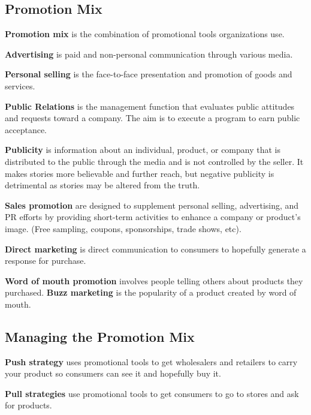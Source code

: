 \documentclass[english, 12pt]{article}
\begin{document}
\subsection{Promotion Mix}
\begin{defn}
\textbf{Promotion mix} is the combination of promotional tools organizations use.
\end{defn}
\begin{defn}
\textbf{Advertising} is paid and non-personal communication through various media.
\end{defn}
\begin{defn}
\textbf{Personal selling} is the face-to-face presentation and promotion of goods and services.
\end{defn}
\begin{defn}
\textbf{Public Relations} is the management function that evaluates public attitudes and requests toward a company. The aim is to execute a program to earn public acceptance.
\end{defn}
\begin{defn}
\textbf{Publicity} is information about an individual, product, or company that is distributed to the public through the media and is not controlled by the seller. It makes stories more believable and further reach, but negative publicity is detrimental as stories may be altered from the truth.
\end{defn}
\begin{defn}
\textbf{Sales promotion} are designed to supplement personal selling, advertising, and PR efforts by providing short-term activities to enhance a company or product's image. (Free sampling, coupons, sponsorships, trade shows, etc).
\end{defn}
\begin{defn}
\textbf{Direct marketing} is direct communication to consumers to hopefully generate a response for purchase.
\end{defn}
\begin{exmp}
\textbf{Word of mouth promotion} involves people telling others about products they purchased. \textbf{Buzz marketing} is the popularity of a product created by word of mouth.
\end{exmp}
\subsection{Managing the Promotion Mix}
\begin{defn}
\textbf{Push strategy} uses promotional tools to get wholesalers and retailers to carry your product so consumers can see it and hopefully buy it.
\end{defn}
\begin{defn}
\textbf{Pull strategies} use promotional tools to get consumers to go to stores and ask for products.
\end{defn}
\end{document}
